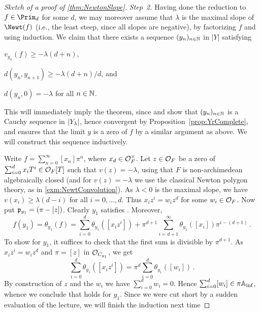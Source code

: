\begin{proof}[Sketch of a proof of \cref{thm:NewtonSlope}]
	\emph{Step~2.} Having done the reduction to $f\in\Prim_d$ for some $d$, we may moreover assume that $\lambda$ is the maximal slope of $\Newt(f)$ (i.e., the least steep, since all slopes are negative), by factorizing $f$ and using induction. We claim that there exists a sequence $(y_n)_{n\in\mathbb{N}}$ in $|Y|$ satisfying
	\begin{alphanumerate}
		\item $v_{y_n}(f)\geq -\lambda(d+n)$,
		\item $d(y_n,y_{n+1})\geq -\lambda(d+n)/d$, and
		\item $d(y_n,0)=-\lambda$ for all $n\in\mathbb{N}$.
	\end{alphanumerate}
	This will immediately imply the theorem, since  and  show that $(y_n)_{n\in\mathbb{N}}$ is a Cauchy sequence in $|Y_{\-\lambda}|$, hence convergent by Proposition~\cref{prop:YrComplete}, and  ensures that the limit $y$ is a zero of $f$ by a similar argument as above. We will construct this sequence inductively.
	
	Write $f= \sum_{n=0}^\infty[x_n]\pi^n$, where $x_d\in\mathcal{O}_F^\times$. Let $z\in\mathcal{O}_F$ be a zero of $\sum_{i=0}^dx_iT^i\in\mathcal{O}_F[T]$ such that $v(z)=-\lambda$, using that $F$ is non-archimedean algebraically closed (and for $v(z)=-\lambda$ we use the classical Newton polygon theory, as in \cref{exm:NewtConvolution}). As $\lambda <0$ is the maximal slope, we have $v(x_i)\geq \lambda(d-i)$ for all $i=0,\dotsc,d$. Thus $x_iz^i=w_iz^d$ for some $w_i\in\mathcal{O}_F$. Now put $\mathfrak{p}_{y_1}=(\pi-[z])$. Clearly $y_1$ satisfies . Moreover,
	\begin{equation*}
		f(y_1)=\theta_{y_1}(f)=\sum_{i=0}^d\theta_{y_1}([x_iz^i])+\pi^{d+1}\sum_{i=d+1}^\infty\theta_{y_1}([x_i])\pi^{i-(d+1)}\,.
	\end{equation*}
	To show  for $y_1$, it suffices to check that the first sum is divisible by $\pi^{d+1}$. As $x_iz^i=w_iz^d$ and $\pi=[z]$ in $\mathcal{O}_{C_{y_1}}$, we get
	\begin{equation*}
		\sum_{i=0}^d\theta_{y_1}([x_iz^i])=\pi^d\sum_{i=0}^d\theta_{y_1}([w_i])\,.
	\end{equation*}
	By construction of $z$ and the $w_i$ we have $\sum_{i=0}^dw_i=0$. Hence $\sum_{i=0}^d[w_i]\in\pi\mathbb{A}_{\mathrm{inf}}$, whence we conclude that  holds for $y_1$. Since we were cut short by a sudden evaluation of the lecture, we will finish the induction next time \dotso
	

\end{proof}
